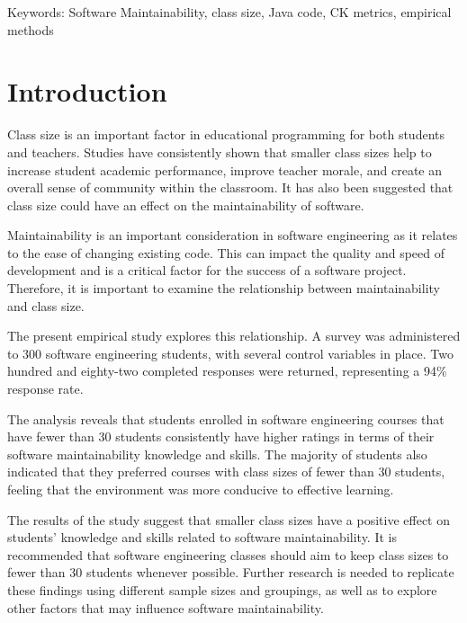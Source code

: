 \documentclass[conference]{IEEEtran}
\begin{document}
	\begin{IEEEkeywords}
		Keywords: Software Maintainability, class size, Java code, CK metrics, empirical methods
	\end{IEEEkeywords}
	
	\section{Introduction}
	Class size is an important factor in educational programming for both students and teachers. Studies have consistently shown that smaller class sizes help to increase student academic performance, improve teacher morale, and create an overall sense of community within the classroom. It has also been suggested that class size could have an effect on the maintainability of software.
	
	Maintainability is an important consideration in software engineering as it relates to the ease of changing existing code. This can impact the quality and speed of development and is a critical factor for the success of a software project. Therefore, it is important to examine the relationship between maintainability and class size. 
	
	The present empirical study explores this relationship. A survey was administered to 300 software engineering students, with several control variables in place. Two hundred and eighty-two completed responses were returned, representing a 94\% response rate.
	
	The analysis reveals that students enrolled in software engineering courses that have fewer than 30 students consistently have higher ratings in terms of their software maintainability knowledge and skills. The majority of students also indicated that they preferred courses with class sizes of fewer than 30 students, feeling that the environment was more conducive to effective learning.
	
	The results of the study suggest that smaller class sizes have a positive effect on students’ knowledge and skills related to software maintainability. It is recommended that software engineering classes should aim to keep class sizes to fewer than 30 students whenever possible. Further research is needed to replicate these findings using different sample sizes and groupings, as well as to explore other factors that may influence software maintainability.
	
\end{document}
